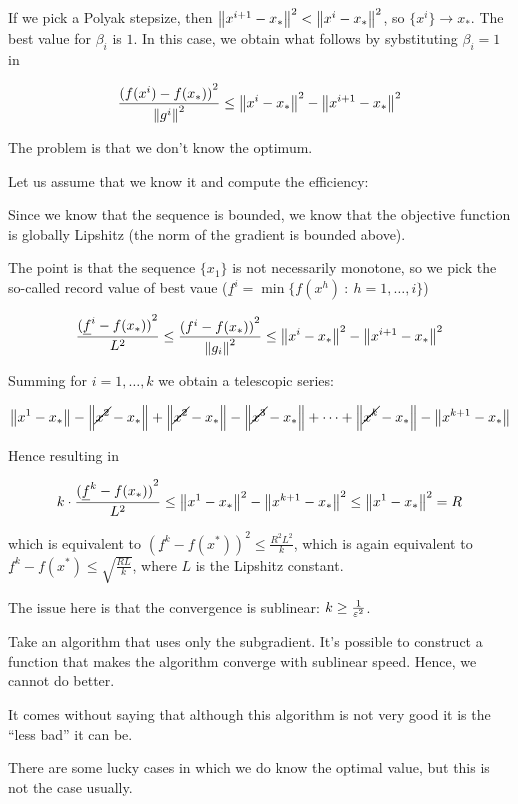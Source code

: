 \documentclass[computational_mathematics.tex]{subfiles}
\begin{document}
If we pick a Polyak stepsize, then ${\left\lVert x^{i+1} - x_*\right\rVert}^2 < {\left\lVert x^i  - x_*\right\rVert}^2$, so $\{x^i \} \to x_*$.
The best value for $\beta_i$ is $1$.
In this case, we obtain what follows by sybstituting $\beta_i = 1$ in 

\[
  \frac{{(f(x^i) - f(x_*))}^2}{{\left\lVert g^i\right\rVert}^2} \le {\left\lVert x^i - x_*\right\rVert}^2 - {\left\lVert x^{i+1} - x_*\right\rVert}^2
\]

The problem is that we don't know the optimum.

Let us assume that we know it and compute the efficiency:

Since we know that the sequence is bounded, we know that the objective function is globally Lipshitz (the norm of the gradient is bounded above).

The point is that the sequence $\{ x_1 \}$ is not necessarily monotone, so we pick the so-called record value of best vaue ($\underline{f}^i = \min \{ f(x^h)~:~h=1, \ldots, i\}$)

\[
  \frac{{(\underline{f}^i - f(x_*))}^2}{L^2} \le \frac{{({f}^i - f(x_*))}^2}{{\left\lVert g_i\right\rVert}^2} \le {\left\lVert x^i - x_*\right\rVert}^2 - {\left\lVert x^{i+1} - x_*\right\rVert}^2
\]

Summing for $i=1, \ldots, k$ we obtain a telescopic series:

\[
  \left\lVert x^1 - x_*\right\rVert - \left\lVert\cancel{x^2} - x_*\right\rVert + \left\lVert\cancel{x^2} - x_*\right\rVert - \left\lVert\cancel{x^3} - x_*\right\rVert + \cdots + \left\lVert\cancel{x^k} - x_*\right\rVert - \left\lVert x^{k+1} - x_*\right\rVert
\]

Hence resulting in

\[
  k \cdot \frac{{(\underline{f}^k - f(x_*))}^2}{L^2} \le {\left\lVert x^1 - x_*\right\rVert}^2 - {\left\lVert x^{k+1} - x_*\right\rVert}^2 \le {\left\lVert x^1 - x_*\right\rVert}^2 = R
\]

which is equivalent to ${(\underline{f}^k - f(x^*))}^2 \le \frac{R^2L^2}{k}$, which is again equivalent to $\underline{f}^k - f(x^*) \le \sqrt{\frac{RL}{k}}$, where $L$ is the Lipshitz constant.

The issue here is that the convergence is sublinear: $k \ge \frac{1}{{\varepsilon}^2}$.


\begin{theorem}
Take an algorithm that uses only the subgradient. It's possible to construct a function that makes the algorithm converge with sublinear speed.
Hence, we cannot do better.
\end{theorem}

It comes without saying that although this algorithm is not very good it is the ``less bad'' it can be.

There are some lucky cases in which we do know the optimal value, but this is not the case usually.
\end{document}
